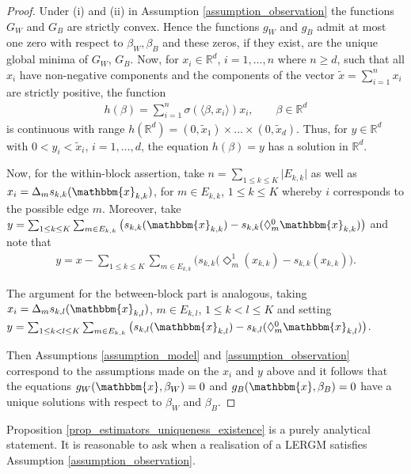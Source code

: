 \documentclass{article}
\begin{document}
\begin{proof}
    Under (i) and (ii) in Assumption \ref{assumption_observation} the functions $G_W$ and $G_B$ are strictly convex. Hence the functions $g_W$ and $g_B$ admit at most one zero with respect to $\beta_W, \beta_B$ and these zeros, if they exist, are  the unique global minima of $G_W$, $G_B$. Now, for $x_i \in \mathbb{R}^d$, $i=1, \ldots, n $ where $n\geq d $, such that all $x_i$ have non-negative components and the components of the vector $\tilde{x}=\sum_{i=1}^n x_i$ are strictly positive, the function
    \begin{align*}
        h(\beta)=\sum_{i=1}^n \sigma(\langle \beta, x_i \rangle ) x_i, \qquad \beta \in \mathbb{R}^d
    \end{align*}
    is continuous with  range $h(\mathbb{R}^d)=(0, \tilde{x}_1) \times \ldots \times (0,\tilde{x}_d)$. Thus, for  $y \in \mathbb{R}^d$ with $0 < y_i < \tilde{x}_i $, $i=1,\ldots,d$, the equation $h(\beta)=y$  has a solution in $\mathbb{R}^d$. \par
    
    Now, for the within-block assertion, take $n = \sum_{1 \leq k\leq K} \vert E_{k,k}\vert$ as well as 
    $x_i = \Delta_m s_{k,k}(\mathbbm{{x}}_{k,k})$, for $m \in E_{k,k}$, $1\leq k \leq K$ whereby $i$ corresponds to the possible edge $m$. Moreover, take $y= \sum_{1\leq k \leq K} \sum_{m \in E_{k,k}} \big( s_{k,k}(\mathbbm{{x}}_{k,k}) -s_{k,k}(\Diamond_{m}^{0}\mathbbm{x}_{k,k}) \big) $ and note that
    \begin{align*}
         y = x - \sum_{1\leq k \leq K} \sum_{m \in E_{k,k}} \big(s_{k,k}( \Diamond_m^1 ( x_{k,k}) - s_{k,k} (x_{k,k}) \big) .
    \end{align*} \par
    The argument for the between-block part is analogous, taking $x_i=\Delta_ms_{k,l}(\mathbbm{x}_{k,l})$, $m \in E_{k,l}$, $1\leq k<l \leq K$ and setting $y= \sum_{1\leq k<l \leq K} \sum_{m \in E_{k,k}} \big( s_{k,l}(\mathbbm{x}_{k,l}) -s_{k,l}(\Diamond_{m}^{0}\mathbbm{x}_{k,l}) \big)$. \par
    Then Assumptions \ref{assumption_model} and \ref{assumption_observation} correspond to the assumptions made on the $x_i$ and $y$ above and it follows that the equations $g_W(\mathbbm{x},\beta_W)=0$ and $g_B(\mathbbm{x},\beta_B)=0$ have a unique solutions with respect to $\beta_W$ and $\beta_B$.
\end{proof}

Proposition \ref{prop_estimators_uniqueness_existence} is a purely analytical statement. It is reasonable to ask when a realisation of a LERGM satisfies Assumption \ref{assumption_observation}. 
\end{document}
